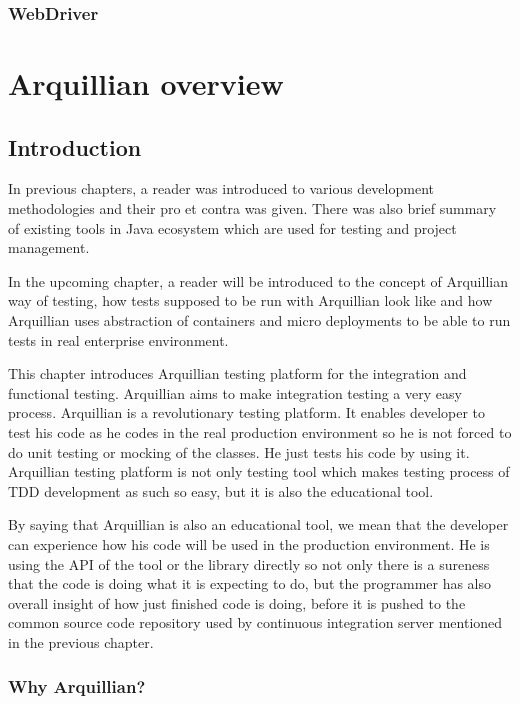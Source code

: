 \documentclass[12pt,final,oneside]{fithesis}
\begin{document}
		\subsection{WebDriver}

\chapter{Arquillian overview}

	\section{Introduction}

In previous chapters, a reader was introduced to various development methodologies and their pro et contra was given. There was also brief summary of existing tools in Java ecosystem which are used for testing and project management.

In the upcoming chapter, a reader will be introduced to the concept of Arquillian way of testing, how tests supposed to be run with Arquillian look like and how Arquillian uses abstraction of containers and micro deployments to be able to run tests in real enterprise environment.

This chapter introduces Arquillian testing platform for the integration and functional testing. Arquillian aims to make integration testing a very easy process. Arquillian is a revolutionary testing platform. It enables developer to test his code as he codes in the real production environment so he is not forced to do unit testing or mocking of the classes. He just tests his code by using it. Arquillian testing platform is not only testing tool which makes testing process of TDD development as such so easy, but it is also the educational tool.

By saying that Arquillian is also an educational tool, we mean that the developer can experience how his code will be used in the production environment. He is using the API of the tool or the library directly so not only there is a sureness that the code is doing what it is expecting to do, but the programmer has also overall insight of how just finished code is doing, before it is pushed to the common source code repository used by continuous integration server mentioned in the previous chapter.


	\subsection{Why Arquillian?}
\end{document}
